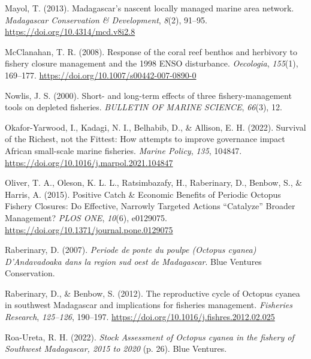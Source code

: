 \documentclass[
]{article}
\newlength{\cslhangindent}
\newlength{\cslentryspacingunit} %
\newenvironment{CSLReferences}[2] %
 {%
  \setlength{\parindent}{0pt}
  \ifodd #1
  \let\oldpar\par
  \def\par{\hangindent=\cslhangindent\oldpar}
  \fi
  \setlength{\parskip}{#2\cslentryspacingunit}
 }%
 {}
\begin{document}
\begin{CSLReferences}{1}{2}
\leavevmode{}%
Mayol, T. (2013). Madagascar's nascent locally managed marine area network. \emph{Madagascar Conservation \& Development}, \emph{8}(2), 91--95. \url{https://doi.org/10.4314/mcd.v8i2.8}

\leavevmode{}%
McClanahan, T. R. (2008). Response of the coral reef benthos and herbivory to fishery closure management and the 1998 {ENSO} disturbance. \emph{Oecologia}, \emph{155}(1), 169--177. \url{https://doi.org/10.1007/s00442-007-0890-0}

\leavevmode{}%
Nowlis, J. S. (2000). Short- and long-term effects of three fishery-management tools on depleted fisheries. \emph{BULLETIN OF MARINE SCIENCE}, \emph{66}(3), 12.

\leavevmode{}%
Okafor-Yarwood, I., Kadagi, N. I., Belhabib, D., \& Allison, E. H. (2022). Survival of the {Richest}, not the {Fittest}: {How} attempts to improve governance impact {African} small-scale marine fisheries. \emph{Marine Policy}, \emph{135}, 104847. \url{https://doi.org/10.1016/j.marpol.2021.104847}

\leavevmode{}%
Oliver, T. A., Oleson, K. L. L., Ratsimbazafy, H., Raberinary, D., Benbow, S., \& Harris, A. (2015). Positive {Catch} \& {Economic Benefits} of {Periodic Octopus Fishery Closures}: {Do Effective}, {Narrowly Targeted Actions} {``{Catalyze}''} {Broader Management}? \emph{PLOS ONE}, \emph{10}(6), e0129075. \url{https://doi.org/10.1371/journal.pone.0129075}

\leavevmode{}%
Raberinary, D. (2007). \emph{{Periode de ponte du poulpe (Octopus cyanea) D'Andavadoaka dans la region sud oest de Madagascar}}. Blue Ventures Conservation.

\leavevmode{}%
Raberinary, D., \& Benbow, S. (2012). The reproductive cycle of {Octopus} cyanea in southwest {Madagascar} and implications for fisheries management. \emph{Fisheries Research}, \emph{125--126}, 190--197. \url{https://doi.org/10.1016/j.fishres.2012.02.025}

\leavevmode{}%
Roa-Ureta, R. H. (2022). \emph{Stock {Assessment} of {Octopus} cyanea in the fishery of {Southwest Madagascar}, 2015 to 2020} (p. 26). Blue Ventures.


\end{CSLReferences}
\end{document}
